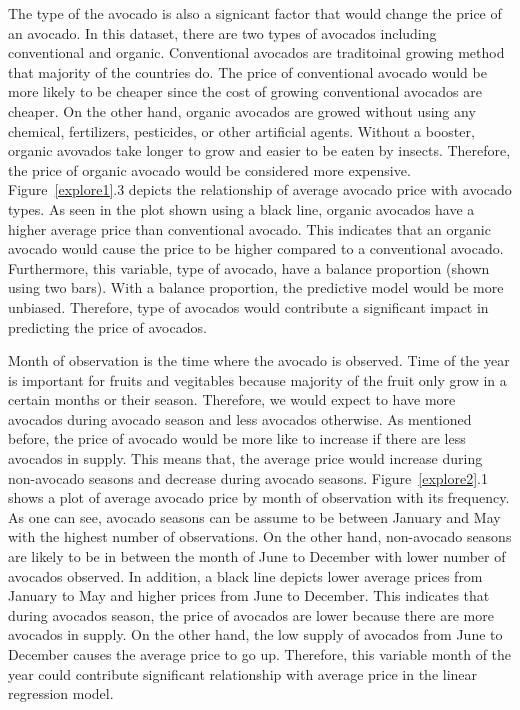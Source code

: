 \documentclass[11pt]{article}\usepackage[]{graphicx}\usepackage[]{color}
\begin{document}
\noindent The type of the avocado is also a signicant factor that would change the price of an avocado. In this dataset, there are two types of avocados including conventional and organic. Conventional avocados are traditoinal growing method that majority of the countries do. The price of conventional avocado would be more likely to be cheaper since the cost of growing conventional avocados are cheaper. On the other hand, organic avocados are growed without using any chemical, fertilizers, pesticides, or other artificial agents. Without a booster, organic avovados take longer to grow and easier to be eaten by insects. Therefore, the price of organic avocado would be considered more expensive. Figure~\ref{explore1}.3 depicts the relationship of average avocado price with avocado types. As seen in the plot shown using a black line, organic avocados have a higher average price than conventional avocado. This indicates that an organic avocado would cause the price to be higher compared to a conventional avocado. Furthermore, this variable, type of avocado, have a balance proportion (shown using two bars). With a balance proportion, the predictive model would be more unbiased. Therefore, type of avocados would contribute a significant impact in predicting the price of avocados.      
\hfill \break

\noindent Month of observation is the time where the avocado is observed. Time of the year is important for fruits and vegitables because majority of the fruit only grow in a certain months or their season. Therefore, we would expect to have more avocados during avocado season and less avocados otherwise. As mentioned before, the price of avocado would be more like to increase if there are less avocados in supply. This means that, the average price would increase during non-avocado seasons and decrease during avocado seasons. Figure~\ref{explore2}.1 shows a plot of average avocado price by month of observation with its frequency. As one can see, avocado seasons can be assume to be between January and May with the highest number of observations. On the other hand, non-avocado seasons are likely to be in between the month of June to December with lower number of avocados observed. In addition, a black line depicts lower average prices from January to May and higher prices from June to December. This indicates that during avocados season, the price of avocados are lower because there are more avocados in supply. On the other hand, the low supply of avocados from June to December causes the average price to go up. Therefore, this variable month of the year could contribute significant relationship with average price in the linear regression model.
\hfill \break
\end{document}

